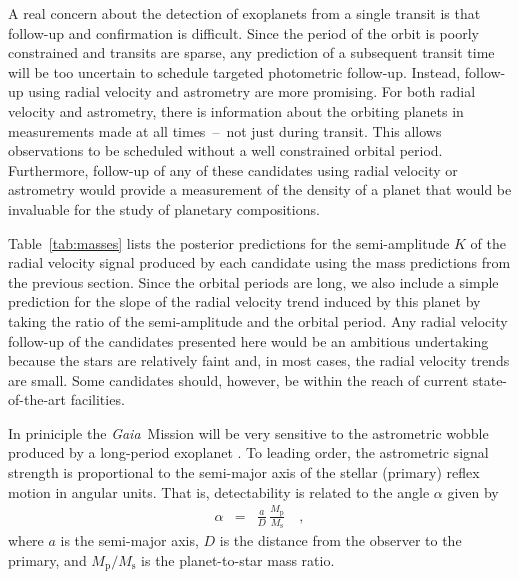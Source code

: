 \documentclass[manuscript, letterpaper]{aastex6}
\makeatletter
\let\origsection\section
\renewcommand\section{\@ifstar{\starsection}{\nostarsection}}
\newcommand\nostarsection[1]{\sectionprelude\origsection{#1}}
\newcommand\starsection[1]{\sectionprelude\origsection*{#1}}
\newcommand\sectionprelude{\vspace{1em}}
\newcommand{\project}[1]{\textsl{#1}}
\newcommand{\gaia}{\project{Gaia}}
\newcommand{\sectlabel}[1]{\label{sect:#1}}
\makeatother
\begin{document}
\section{Prospects for follow-up}\sectlabel{follow-up}

A real concern about the detection of exoplanets from a single transit is that
follow-up and confirmation is difficult.
Since the period of the orbit is poorly constrained and transits are sparse,
any prediction of a subsequent transit time will be too uncertain to schedule
targeted photometric follow-up.
Instead, follow-up using radial velocity and astrometry are more promising.
For both radial velocity and astrometry, there is information about the
orbiting planets in measurements made at all times~--~not just during transit.
This allows observations to be scheduled without a well constrained orbital
period.
Furthermore, follow-up of any of these candidates using radial velocity or
astrometry would provide a measurement of the density of a planet that would
be invaluable for the study of planetary compositions.

Table~\ref{tab:masses} lists the posterior predictions for the semi-amplitude
$K$ of the radial velocity signal produced by each candidate using the mass
predictions from the previous section.
Since the orbital periods are long, we also include a simple prediction for
the slope of the radial velocity trend induced by this planet by taking the
ratio of the semi-amplitude and the orbital period.
Any radial velocity follow-up of the candidates presented here would be an
ambitious undertaking because the stars are relatively faint and, in most
cases, the radial velocity trends are small.
Some candidates should, however, be within the reach of current
state-of-the-art facilities.

In priniciple the \gaia\ Mission will be very sensitive to the astrometric
wobble produced by a long-period exoplanet \citep{Perryman:2014}.
To leading order, the astrometric signal strength is proportional to the
semi-major axis of the stellar (primary) reflex motion in angular units.
That is, detectability is related to the angle $\alpha$ given by
\begin{eqnarray}
\alpha &=& \frac{a}{D}\,\frac{M_{\mathrm p}}{M_{\mathrm s}} \quad ,
\end{eqnarray}
where $a$ is the semi-major axis, $D$ is the distance from the observer to the
primary, and $M_{\mathrm{p}}/M_{\mathrm{s}}$ is the planet-to-star mass ratio.
\end{document}
